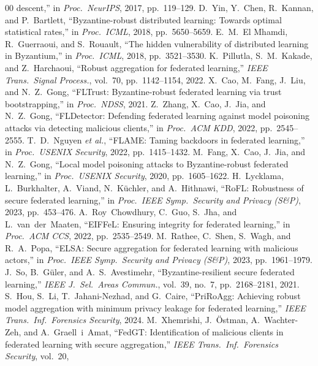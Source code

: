 \documentclass[conference]{IEEEtran}
\begin{document}
\begin{thebibliography}{00}
descent,'' in \emph{Proc.\ NeurIPS}, 2017, pp.\ 119--129.
 D.\ Yin, Y.\ Chen, R.\ Kannan, and P.\ Bartlett,
``Byzantine-robust distributed learning: Towards optimal statistical rates,'' in
\emph{Proc.\ ICML}, 2018, pp.\ 5650--5659.
 E.\ M.\ El Mhamdi, R.\ Guerraoui, and S.\ Rouault, ``The hidden
vulnerability of distributed learning in Byzantium,'' in \emph{Proc.\ ICML}, 2018,
pp.\ 3521--3530.
 K.\ Pillutla, S.\ M.\ Kakade, and Z.\ Harchaoui, ``Robust aggregation
for federated learning,'' \emph{IEEE Trans.\ Signal Process.}, vol.\ 70,
pp.\ 1142--1154, 2022.
 X.\ Cao, M.\ Fang, J.\ Liu, and N.\ Z.\ Gong, ``FLTrust:
Byzantine-robust federated learning via trust bootstrapping,'' in \emph{Proc.\ NDSS},
2021.
 Z.\ Zhang, X.\ Cao, J.\ Jia, and N.\ Z.\ Gong,
``FLDetector: Defending federated learning against model poisoning attacks via
detecting malicious clients,'' in \emph{Proc.\ ACM KDD}, 2022, pp.\ 2545--2555.
 T.\ D.\ Nguyen \emph{et al.}, ``FLAME: Taming backdoors in
federated learning,'' in \emph{Proc.\ USENIX Security}, 2022, pp.\ 1415--1432.
 M.\ Fang, X.\ Cao, J.\ Jia, and N.\ Z.\ Gong, ``Local model
poisoning attacks to Byzantine-robust federated learning,'' in \emph{Proc.\ USENIX
Security}, 2020, pp.\ 1605--1622.
 H.\ Lycklama, L.\ Burkhalter, A.\ Viand, N.\ K\"uchler, and A.\ Hithnawi,
``RoFL: Robustness of secure federated learning,'' in \emph{Proc.\ IEEE Symp.\ Security
and Privacy (S\&P)}, 2023, pp.\ 453--476.
 A.\ Roy~Chowdhury, C.\ Guo, S.\ Jha, and L.\ van~der~Maaten,
``EIFFeL: Ensuring integrity for federated learning,'' in \emph{Proc.\ ACM CCS}, 2022,
pp.\ 2535--2549.
 M.\ Rathee, C.\ Shen, S.\ Wagh, and R.\ A.\ Popa, ``ELSA: Secure
aggregation for federated learning with malicious actors,'' in \emph{Proc.\ IEEE Symp.\
Security and Privacy (S\&P)}, 2023, pp.\ 1961--1979.
 J.\ So, B.\ G\"uler, and A.\ S.\ Avestimehr,
``Byzantine-resilient secure federated learning,'' \emph{IEEE J.\ Sel.\ Areas
Commun.}, vol.\ 39, no.\ 7, pp.\ 2168--2181, 2021.
 S.\ Hou, S.\ Li, T.\ Jahani-Nezhad, and G.\ Caire, ``PriRoAgg:
Achieving robust model aggregation with minimum privacy leakage for federated
learning,'' \emph{IEEE Trans.\ Inf.\ Forensics Security}, 2024.
 M.\ Xhemrishi, J.\ \"Ostman, A.\ Wachter-Zeh, and A.\ Graell~i~Amat,
``FedGT: Identification of malicious clients in federated learning with secure
aggregation,'' \emph{IEEE Trans.\ Inf.\ Forensics Security}, vol.\ 20,

\end{thebibliography}
\end{document}
